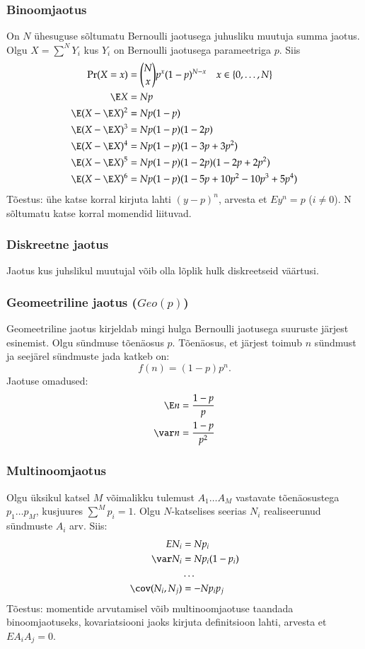 \documentclass[a4paper]{article}
\numberwithin{equation}{subsection}
\begin{document}
\subsubsection{Binoomjaotus}
On $N$ ühesuguse sõltumatu Bernoulli jaotusega juhusliku muutuja summa
jaotus.  Olgu $X = \sum^N Y_i$ kus $Y_i$ on Bernoulli jaotusega
parameetriga $p$.  Siis
\begin{align*}
  \Pr(X = x) &= \binom{N}{x} p^x (1-p)^{N-x} \quad x\in \{0, \ldots ,N\}
  \\
  \E X &= Np \\
\E ( X - \E X)^2 &= N p( 1 - p) \\
\E ( X - \E X)^3 &= N p( 1 - p)( 1 - 2p)\\
\E ( X - \E X)^4 &= N p( 1 - p)( 1 - 3p + 3p^{2})
\\
\E ( X - \E X)^5 &= N p( 1 - p)(1 - 2p)( 1 - 2p + 2p^{2})
\\
\E ( X - \E X)^6 &= N p( 1 - p) (1 - 5p + 10p^2 - 10p^3 + 5p^4)
\end{align*}
Tõestus: ühe katse korral kirjuta lahti $(y-p)^n$, arvesta et $Ey^n=p$
($i\not=0$).  N sõltumatu katse korral momendid liituvad.

\subsubsection{Diskreetne jaotus}
Jaotus kus juhslikul muutujal võib olla lõplik hulk diskreetseid
väärtusi. 

\subsubsection{Geomeetriline jaotus ($Geo(p)$)}
Geomeetriline jaotus kirjeldab mingi hulga Bernoulli jaotusega
suuruste järjest esinemist.  Olgu sündmuse tõenäosus $p$.  Tõenäosus,
et järjest toimub $n$ sündmust ja seejärel sündmuste jada katkeb on:
\begin{equation}
f(n) = (1-p)p^n.
\end{equation}
Jaotuse omadused:
\begin{eqnarray}
\E n = \frac{1-p}{p}\\
\var n = \frac{1-p}{p^2}
\end{eqnarray}


\subsubsection{Multinoomjaotus}
Olgu üksikul katsel $M$ võimalikku tulemust $A_1 \ldots A_M$ vastavate
tõenäosustega $p_1 \ldots p_M$, kusjuures $\sum^M p_i = 1$.  Olgu
$N$-katselises seerias $N_i$  realiseerunud sündmuste $A_i$ arv.
Siis:
\begin{align}
E N_i &= Np_i \\
\var N_i &= N p_i ( 1 - p_i) \\
&\ldots \notag\\
\cov( N_i, N_j) &= -N p_i p_j
\end{align}
Tõestus: momentide arvutamisel võib multinoomjaotuse taandada
binoomjaotuseks, kovariatsiooni jaoks kirjuta definitsioon lahti,
arvesta et $E A_i A_j = 0$.
\end{document}
